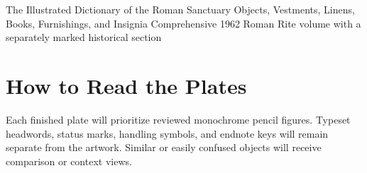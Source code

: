 

\newcommand{\DictionaryLeafRoot}{liturgy/roman-rite/1962/reference/roman-sanctuary-dictionary/comprehensive}

\DictionaryTitle
  {The Illustrated Dictionary of the Roman Sanctuary}
  {Objects, Vestments, Linens, Books, Furnishings, and Insignia}
  {Comprehensive 1962 Roman Rite volume with a separately marked historical section}
\section*{How to Read the Plates}
Each finished plate will prioritize reviewed monochrome pencil figures.
Typeset headwords, status marks, handling symbols, and endnote keys will remain
separate from the artwork. Similar or easily confused objects will receive
comparison or context views.

\DictionaryTerminalMatter
{\scriptsize}

